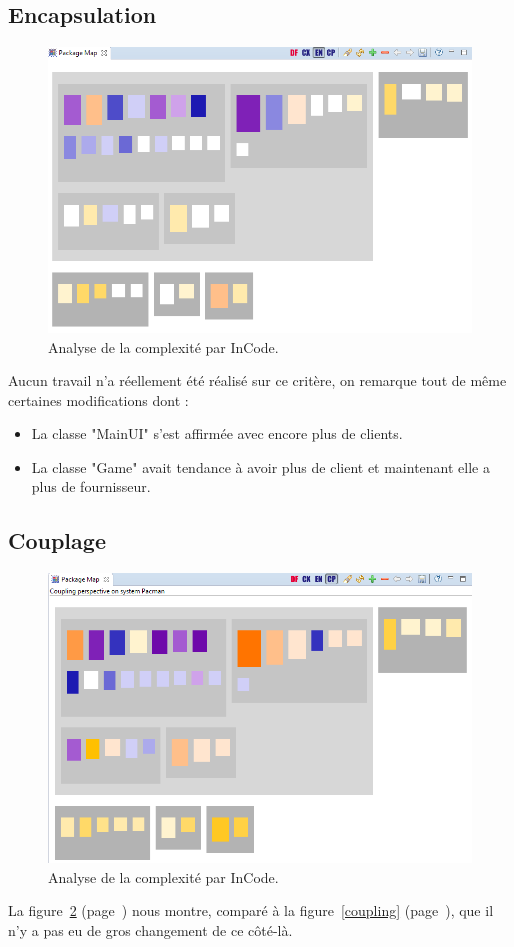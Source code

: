 \documentclass[12pt,a4paper,final]{article}
\newcommand{\labelfigure}[1]{figure~\ref{#1} (page~\pageref{#1})}
\begin{document}
\subsection{Encapsulation}
\begin{figure}[!h]
	\centering
	\includegraphics[width=\textwidth]{InCodeEncapsulation_refactor.png}
	\caption{\label{encapsulation_refact}Analyse de la complexité par InCode.}
\end{figure}
Aucun travail n'a réellement été réalisé sur ce critère, on remarque tout de même certaines modifications dont : 
\begin{itemize}
\item La classe "MainUI" s'est affirmée avec encore plus de clients.
\item La classe "Game" avait tendance à avoir plus de client et maintenant elle a plus de fournisseur.
\end{itemize}
\subsection{Couplage}
\begin{figure}[!h]
	\centering
	\includegraphics[width=\textwidth]{InCodeCoupling_refactor.png}
	\caption{\label{coupling_refact}Analyse de la complexité par InCode.}
\end{figure}
La \labelfigure{coupling_refact} nous montre, comparé à la \labelfigure{coupling}, que il n'y a pas eu de gros changement de ce côté-là.
\end{document}
